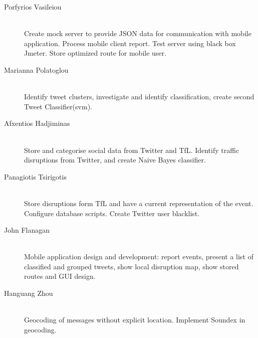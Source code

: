 \begin{description}
  \item[Porfyrios Vasileiou] \hfill \\
  Create mock server to provide JSON data for
  communication with mobile application. Process mobile client report. Test
  server using black box Jmeter. Store optimized route for mobile user.

  \item[Marianna Polatoglou] \hfill \\
  Identify tweet clusters, investigate and identify
  classification, create second Tweet Classifier(svm).

  \item[Afxentios Hadjiminas] \hfill \\
  Store and categorise social data from Twitter and
  TfL. Identify traffic disruptions from Twitter, and create Naive Bayes
  classifier.

  \item[Panagiotis Tsirigotis] \hfill \\
  Store disruptions form TfL and have a current
  representation of the event. Configure database scripts. Create Twitter user
  blacklist.

  \item[John Flanagan] \hfill \\
  Mobile application design and development: report
  events, present a list of classified and grouped tweets, show local
  disruption map, show stored routes and GUI design.

  \item[Hanguang Zhou] \hfill \\
  Geocoding of messages without explicit location.
  Implement Soundex in geocoding.
\end{description}

